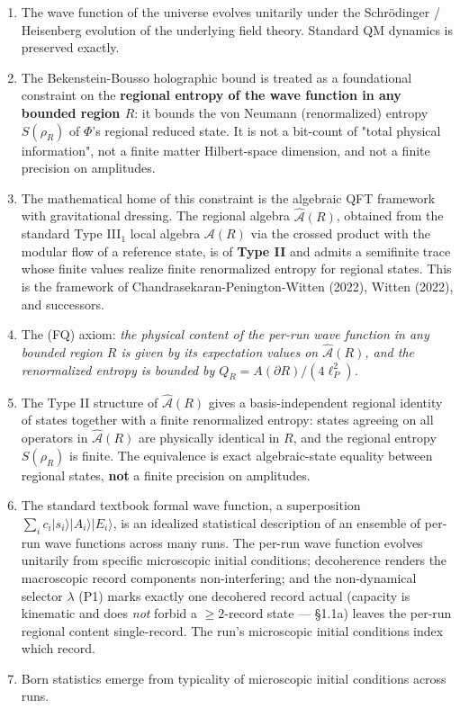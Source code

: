 \documentclass[11pt,a4paper]{article}
\begin{document}
\begin{enumerate}
  \item The wave function of the universe evolves unitarily under the Schrödinger / Heisenberg evolution of the underlying field theory. Standard QM dynamics is preserved exactly.
  \item The Bekenstein-Bousso holographic bound is treated as a foundational constraint on the \textbf{regional entropy of the wave function in any bounded region $R$}: it bounds the von Neumann (renormalized) entropy $S(\rho_R)$ of $\Phi$'s regional reduced state. It is not a bit-count of "total physical information", not a finite matter Hilbert-space dimension, and not a finite precision on amplitudes.
  \item The mathematical home of this constraint is the algebraic QFT framework with gravitational dressing. The regional algebra $\hat{\mathcal{A}}(R)$, obtained from the standard Type III$_1$ local algebra $\mathcal{A}(R)$ via the crossed product with the modular flow of a reference state, is of \textbf{Type II} and admits a semifinite trace whose finite values realize finite renormalized entropy for regional states. This is the framework of Chandrasekaran-Penington-Witten (2022), Witten (2022), and successors.
  \item The (FQ) axiom: \emph{the physical content of the per-run wave function in any bounded region $R$ is given by its expectation values on $\hat{\mathcal{A}}(R)$, and the renormalized entropy is bounded by $Q_R = A(\partial R)/(4\ell_P^2)$.}
  \item The Type II structure of $\hat{\mathcal{A}}(R)$ gives a basis-independent regional identity of states together with a finite renormalized entropy: states agreeing on all operators in $\hat{\mathcal{A}}(R)$ are physically identical in $R$, and the regional entropy $S(\rho_R)$ is finite. The equivalence is exact algebraic-state equality between regional states, \textbf{not} a finite precision on amplitudes.
  \item The standard textbook formal wave function, a superposition $\sum_i c_i |s_i\rangle|A_i\rangle|E_i\rangle$, is an idealized statistical description of an ensemble of per-run wave functions across many runs. The per-run wave function evolves unitarily from specific microscopic initial conditions; decoherence renders the macroscopic record components non-interfering; and the non-dynamical selector $\lambda$ (P1) marks exactly one decohered record actual (capacity is kinematic and does \emph{not} forbid a $\ge 2$-record state — §1.1a) leaves the per-run regional content single-record. The run's microscopic initial conditions index which record.
  \item Born statistics emerge from typicality of microscopic initial conditions across runs.
\end{enumerate}
\end{document}
